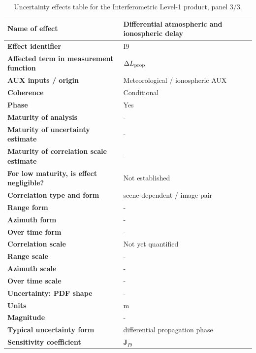 \begin{table}[p]
\centering\scriptsize
\renewcommand{\arraystretch}{1.1}
\caption{Uncertainty effects table for the Interferometric Level-1 product, panel 3/3. }
\label{tab:insar_effects_table_proposed_3}
\begin{tabularx}{\textwidth}{|>{\raggedright\arraybackslash}p{3.0cm}|*{1}{>{\raggedright\arraybackslash}X|}}\hline
\textbf{Name of effect} & Differential atmospheric and ionospheric delay \\ \hline
\textbf{Effect identifier} & I9 \\ \hline
\textbf{Affected term in measurement function} & $\Delta L_{\rm prop}$ \\ \hline
\textbf{AUX inputs / origin} & Meteorological / ionospheric AUX \\ \hline
\textbf{Coherence} & Conditional \\ \hline
\textbf{Phase} & Yes \\ \hline
\textbf{Maturity of analysis} & - \\ \hline
\textbf{Maturity of uncertainty estimate} & - \\ \hline
\textbf{Maturity of correlation scale estimate} & - \\ \hline
\textbf{For low maturity, is effect negligible?} & Not established \\ \hline
\textbf{Correlation type and form} & scene-dependent / image pair \\ \hline
\textbf{Range form} & - \\ \hline
\textbf{Azimuth form} & - \\ \hline
\textbf{Over time form} & - \\ \hline
\textbf{Correlation scale} & Not yet quantified \\ \hline
\textbf{Range scale} & - \\ \hline
\textbf{Azimuth scale} & - \\ \hline
\textbf{Over time scale} & - \\ \hline
\textbf{Uncertainty: PDF shape} & - \\ \hline
\textbf{Units} & m \\ \hline
\textbf{Magnitude} & - \\ \hline
\textbf{Typical uncertainty form} & differential propagation phase \\ \hline
\textbf{Sensitivity coefficient} & $\mathbf J_{I9}$ \\ \hline
\end{tabularx}
\end{table}

